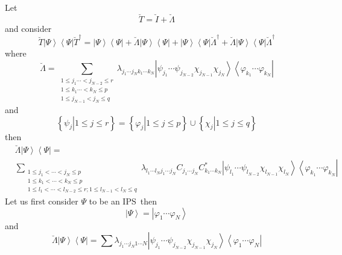 \documentclass[aps,preprint]{revtex4}%
\begin{document}
Let
\begin{equation}
\breve{T}=\breve{I}+\breve{\Lambda}%
\end{equation}
and consider
\begin{equation}
\breve{T}\left\vert \Psi\right\rangle \left\langle \Psi\right\vert \breve
{T}^{\dagger}=\left\vert \Psi\right\rangle \left\langle \Psi\right\vert
+\breve{\Lambda}\left\vert \Psi\right\rangle \left\langle \Psi\right\vert
+\left\vert \Psi\right\rangle \left\langle \Psi\right\vert \breve{\Lambda
}^{\dagger}+\breve{\Lambda}\left\vert \Psi\right\rangle \left\langle
\Psi\right\vert \breve{\Lambda}^{\dagger}%
\end{equation}
where%
\begin{equation}
\breve{\Lambda}=\sum_{\substack{1\leq j_{1}\cdots<j_{N-2}\leq r\\1\leq
k_{1}\cdots<k_{N}\leq p\\1\leq j_{N-1}<j_{N}\leq q}}\lambda_{j_{1}\cdots
j_{N}k_{1}\cdots k_{N}}\left\vert \psi_{j_{1}}\cdots\psi_{j_{N-2}}%
\chi_{j_{N-1}}\chi_{j_{N}}\right\rangle \left\langle \varphi_{k_{1}}%
\cdots\varphi_{k_{N}}\right\vert
\end{equation}
and%
\begin{equation}
\left\{  \left.  \psi_{j}\right\vert 1\leq j\leq r\right\}  =\left\{  \left.
\varphi_{j}\right\vert 1\leq j\leq p\right\}  \cup\left\{  \left.  \chi
_{j}\right\vert 1\leq j\leq q\right\}
\end{equation}
then
\begin{align}
&  \breve{\Lambda}\left\vert \Psi\right\rangle \left\langle \Psi\right\vert
=\\
&  \sum_{\substack{1\leq j_{1}<\cdots<j_{N}\leq p\\1\leq k_{1}<\cdots
<k_{N}\leq p\\1\leq l_{1}<\cdots<l_{N-2}\leq r;1\leq l_{N-1}<l_{N}\leq
q}}\lambda_{l_{1}\cdots l_{N}j_{1}\cdots j_{N}}C_{j_{1}\cdots j_{N}}%
C_{k_{1}\cdots k_{N}}^{\ast}\left\vert \psi_{l_{1}}\cdots\psi_{l_{N-2}}%
\chi_{l_{N-1}}\chi_{l_{N}}\right\rangle \left\langle \varphi_{k_{1}}%
\cdots\varphi_{k_{N}}\right\vert
\end{align}
Let us first consider $\Psi$ to be an IPS\ then
\begin{equation}
\left\vert \Psi\right\rangle =\left\vert \varphi_{1}\cdots\varphi
_{N}\right\rangle
\end{equation}
and
\begin{equation}
\breve{\Lambda}\left\vert \Psi\right\rangle \left\langle \Psi\right\vert
=\sum\lambda_{j_{1}\cdots j_{N}1\cdots N}\left\vert \psi_{j_{1}}\cdots
\psi_{j_{N-2}}\chi_{j_{N-1}}\chi_{j_{N}}\right\rangle \left\langle \varphi
_{1}\cdots\varphi_{N}\right\vert
\end{equation}
\end{document}
